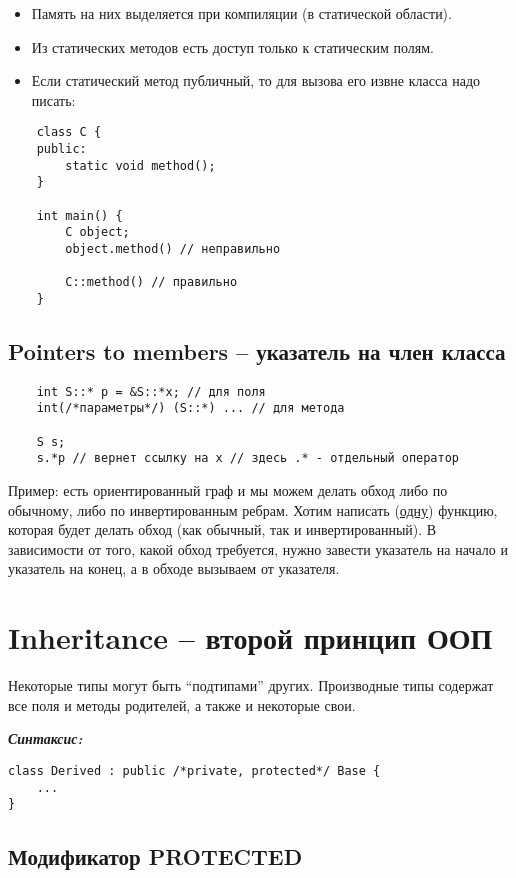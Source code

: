 \documentclass[12pt]{article}
\begin{document}
\begin{itemize}
	\item Память на них выделяется при компиляции (в статической области).
	\item Из статических методов есть доступ только к статическим полям. 
	\item Если статический метод публичный, то для вызова его извне класса надо писать: 
\end{itemize} 

\begin{lstlisting}
	class C {
 	public:
		static void method();
	}

	int main() {
		C object;
		object.method() // неправильно
	
		C::method() // правильно
	}
\end{lstlisting}
 

\subsection[Pointers to members]{Pointers to members -- указатель на член класса}

\begin{lstlisting}
	int S::* p = &S::*x; // для поля
	int(/*параметры*/) (S::*) ... // для метода 
	
	S s;
	s.*p // вернет ссылку на x // здесь .* - отдельный оператор
\end{lstlisting}

Пример: есть ориентированный граф и мы можем делать обход либо по обычному, либо по инвертированным ребрам. Хотим написать (\underline{одну}) функцию, которая будет делать обход (как обычный, так и инвертированный). В зависимости от того, какой обход требуется, нужно завести указатель на начало и указатель на конец, а в обходе вызываем от указателя. 

\section[Inheritance (наследование)]{Inheritance -- второй принцип ООП}
Некоторые типы могут быть ``подтипами'' других. Производные типы содержат все поля и методы родителей, а также и некоторые свои. 

\textbf{\textit{Синтаксис:}}
\begin{lstlisting}
class Derived : public /*private, protected*/ Base {
	...
}
\end{lstlisting}

\subsection{Модификатор PROTECTED}
\end{document}

